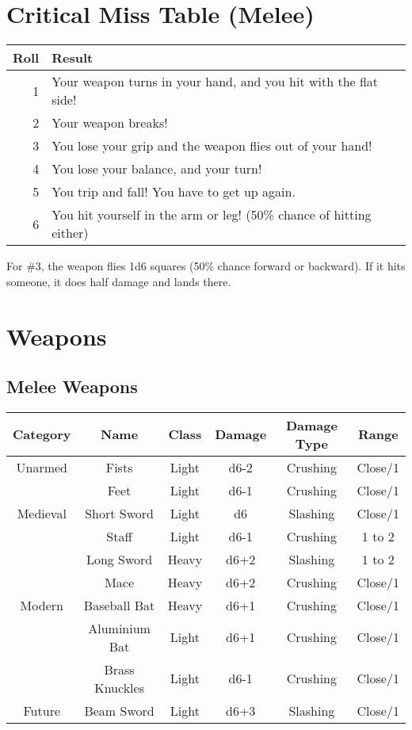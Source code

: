 \section{Critical Miss Table (Melee)}
\begin{center}
\begin{tabular}{r | l}
    \textbf{Roll} & \textbf{Result}\\\hline
    1 & Your weapon turns in your hand, and you hit with the flat side! \\
    2 & Your weapon breaks! \\
    3 & You lose your grip and the weapon flies out of your hand! \\
    4 & You lose your balance, and your turn! \\
    5 & You trip and fall! You have to get up again.\\
    6 & You hit yourself in the arm or leg! (50\% chance of hitting either)\\
\end{tabular}
\end{center}
\begin{note} 
    For \#3, the weapon flies 1d6 squares (50\% chance forward or backward). If it hits someone, it does half damage and lands there.
\end{note}

\section{Weapons} \label{sec:weapons}
\subsection{Melee Weapons}
\begin{center}
\begin{tabular}{c|c|c|c|c|c}
    \textbf{Category} & \textbf{Name} & \textbf{Class} & \textbf{Damage} & \textbf{Damage Type} & \textbf{Range} \\\hline
    Unarmed  & Fists          & Light & d6-2 & Crushing & Close/1\\
             & Feet           & Light & d6-1 & Crushing & Close/1\\\hline
    Medieval & Short Sword    & Light & d6   & Slashing & Close/1\\
             & Staff          & Light & d6-1 & Crushing & 1 to 2 \\
             & Long Sword     & Heavy & d6+2 & Slashing & 1 to 2 \\
             & Mace           & Heavy & d6+2 & Crushing & Close/1\\\hline
    Modern   & Baseball Bat   & Heavy & d6+1 & Crushing & Close/1\\
             & Aluminium Bat  & Light & d6+1 & Crushing & Close/1\\
             & Brass Knuckles & Light & d6-1 & Crushing & Close/1\\\hline
    Future   & Beam Sword     & Light & d6+3 & Slashing & Close/1
\end{tabular}
\end{center}

